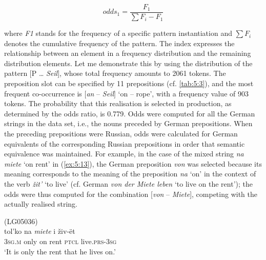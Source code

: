 \begin{equation*}
odds_{1} = \frac{F_{1}}{\sum F_{i}-F_{1}}
\end{equation*}

\noindent where \textit{F1} stands for the frequency of a specific pattern instantiation and \(\sum F_{i}\) denotes the cumulative frequency of the pattern. The index expresses the relationship between an element in a frequency distribution and the remaining distribution elements. Let me demonstrate this by using the distribution of the pattern \([\)P \dots{} \textit{Seil}\(]\), whose total frequency amounts to 2061 tokens. The preposition slot can be specified by 11 prepositions (cf. \ref{tab:5:3}), and  the most frequent co-occurrence is \([\)\textit{an} -- \textit{Seil}\(]\) `on -- rope', with a frequency value of 903 tokens. The probability that this realisation is selected in production, as determined by the odds ratio, is 0.779. Odds were computed for all the German strings in the data set, i.e., the nouns preceded by German prepositions. When the preceding prepositions were Russian, odds were calculated for German equivalents of the corresponding Russian prepositions in order that semantic equivalence was maintained. For example, in the case of the mixed string \textit{na miete} `on rent' in (\ref{ex:5:13}), the German preposition \textit{von} was selected because its meaning corresponds to the meaning of the preposition \textit{na} `on' in the context of the verb \textit{žit'} `to live' (cf. German \textit{von der Miete leben} `to live on the rent'); the odds were thus computed for the combination [\textit{von}  --  \textit{Miete}], competing with the actually realised string.

\ea
(LG05036)\label{ex:5:13}\\
 {tol'ko} {na} \textit{miete} {i} {živ-ët}\\
	{3\textsc{sg.m}} only on rent \textsc{ptcl} live.\textsc{prs-3sg}\\
\glt `It is only the rent that he lives on.'
\z

